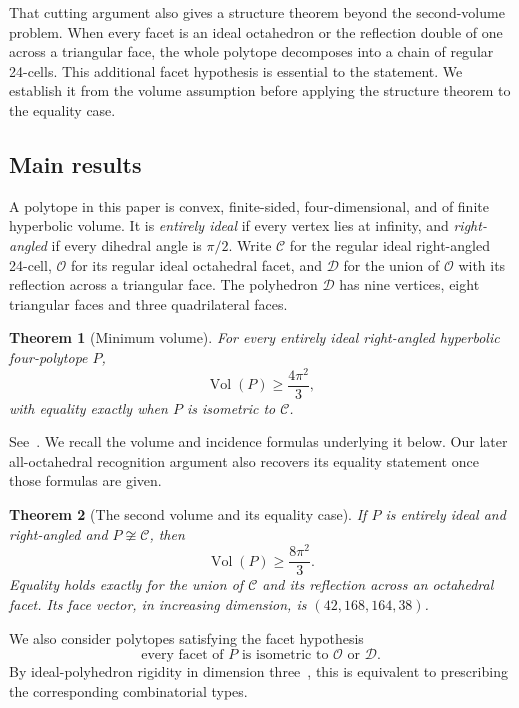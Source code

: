 \documentclass[11pt]{article}
\newtheorem{theorem}{Theorem}[section]
\theoremstyle{remark}
\newcommand{\Vol}{\operatorname{Vol}}
\newcommand{\OCT}{\mathcal O}
\newcommand{\DBL}{\mathcal D}
\newcommand{\CELL}{\mathcal C}
\begin{document}
That cutting argument also gives a structure theorem beyond the
second-volume problem. When every facet is an ideal octahedron or
the reflection double of one across a triangular face, the whole
polytope decomposes into a chain of regular 24-cells. This additional
facet hypothesis is essential to the statement. We establish it from
the volume assumption before applying the structure theorem to the
equality case.

\subsection{Main results}

A polytope in this paper is convex, finite-sided, four-dimensional,
and of finite hyperbolic volume. It is \emph{entirely ideal} if every
vertex lies at infinity, and \emph{right-angled} if every dihedral
angle is $\pi/2$. Write $\CELL$ for the regular ideal right-angled
24-cell, $\OCT$ for its regular ideal octahedral facet, and $\DBL$
for the union of $\OCT$ with its reflection across a triangular
face. The polyhedron $\DBL$ has nine vertices, eight triangular
faces and three quadrilateral faces.

\begin{theorem}[Minimum volume]\label{thm:minimum}
For every entirely ideal right-angled hyperbolic four-polytope $P$,
\[
 \Vol(P)\ge\frac{4\pi^2}{3},
\]
with equality exactly when $P$ is isometric to $\CELL$.
\end{theorem}
See~\cite[Theorem~3]{Kolpakov}. We recall the
volume and incidence formulas underlying it below. Our later
all-octahedral recognition argument also recovers its equality
statement once those formulas are given.

\begin{theorem}[The second volume and its equality case]\label{thm:gap}
If $P$ is entirely ideal and right-angled and $P\not\cong\CELL$, then
\[
 \Vol(P)\ge\frac{8\pi^2}{3}.
\]
Equality holds exactly for the union of $\CELL$ and its reflection
across an octahedral facet. Its face vector, in increasing dimension,
is $(42,168,164,38)$.
\end{theorem}

We also consider polytopes satisfying the facet hypothesis
\begin{equation}\label{eq:spectrum}
 \text{every facet of $P$ is isometric to $\OCT$ or $\DBL$.}
\end{equation}
By ideal-polyhedron rigidity in dimension three~\cite{Rivin}, this
is equivalent to prescribing the corresponding combinatorial types.
\end{document}

